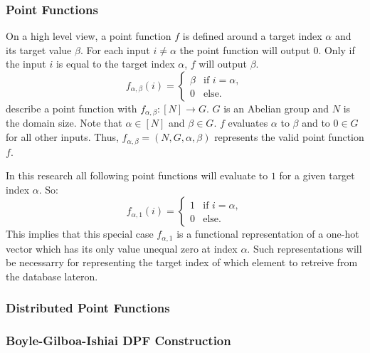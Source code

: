 \label{sec_dpfs}
\subsubsection{Point Functions}
On a high level view, a point function $f$ is defined around a target index $\alpha$ and its target value $\beta$.
For each input $i\neq\alpha$ the point function will output $0$.
Only if the input $i$ is equal to the target index $\alpha$, $f$ will output $\beta$.
\[
f_{\alpha,\beta}(i) = \begin{cases} 
      \beta & \text{if } i = \alpha, \\
      0 & \text{else}.
   \end{cases}
\]
\cite{boyle2023information} describe a point function with $f_{\alpha, \beta}:[N]\rightarrow G$. 
$G$ is an Abelian group and $N$ is the domain size.
Note that $\alpha\in[N]$ and $\beta\in G$.
$f$ evaluates $\alpha$ to $\beta$ and to $0\in G$ for all other inputs.
Thus, $f_{\alpha,\beta}=(N,G,\alpha,\beta)$ represents the valid point function $f$.

In this research all following point functions will evaluate to $1$ for a given target index $\alpha$.
So:
\[
f_{\alpha,1}(i) = \begin{cases} 
      1 & \text{if } i = \alpha, \\
      0 & \text{else}.
   \end{cases}
\]
This implies that this special case $f_{\alpha,1}$ is a functional representation of a one-hot vector which has its only value unequal zero at index $\alpha$.
Such representations will be necessarry for representing the target index of which element to retreive from the database lateron.

\subsubsection{Distributed Point Functions}

\subsubsection{Boyle-Gilboa-Ishiai DPF Construction}